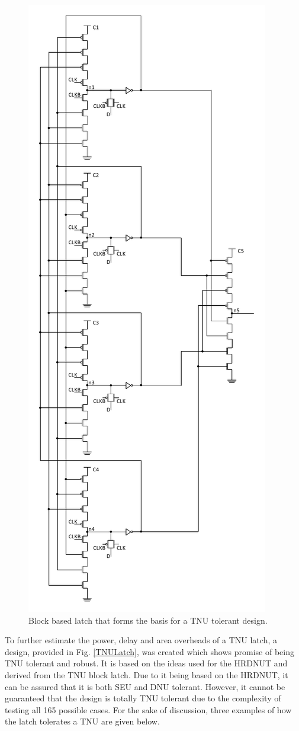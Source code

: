 \begin{figure}[!htbp]
	\centering
	\includegraphics[width=0.50\linewidth]{Figures/TNUBlatch}
	\caption{Block based latch that forms the basis for a TNU tolerant design.}
	\label{TNUB}
\end{figure}

To further estimate the power, delay and area overheads of a TNU latch, a design, provided in Fig. \ref{TNULatch}, was created which shows promise of being TNU tolerant and robust. It is based on the ideas used for the HRDNUT and derived from the TNU block latch. Due to it being based on the HRDNUT, it can be assured that it is both SEU and DNU tolerant. However, it cannot be guaranteed that the design is totally TNU tolerant due to the complexity of testing all 165 possible cases. For the sake of discussion, three examples of how the latch tolerates a TNU are given below.  

